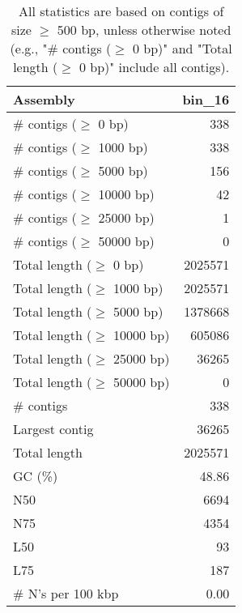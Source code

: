 \documentclass[12pt,a4paper]{article}
\begin{document}
\begin{table}[ht]
\begin{center}
\caption{All statistics are based on contigs of size $\geq$ 500 bp, unless otherwise noted (e.g., "\# contigs ($\geq$ 0 bp)" and "Total length ($\geq$ 0 bp)" include all contigs).}
\begin{tabular}{|l*{1}{|r}|}
\hline
Assembly & bin\_16 \\ \hline
\# contigs ($\geq$ 0 bp) & 338 \\ \hline
\# contigs ($\geq$ 1000 bp) & 338 \\ \hline
\# contigs ($\geq$ 5000 bp) & 156 \\ \hline
\# contigs ($\geq$ 10000 bp) & 42 \\ \hline
\# contigs ($\geq$ 25000 bp) & 1 \\ \hline
\# contigs ($\geq$ 50000 bp) & 0 \\ \hline
Total length ($\geq$ 0 bp) & 2025571 \\ \hline
Total length ($\geq$ 1000 bp) & 2025571 \\ \hline
Total length ($\geq$ 5000 bp) & 1378668 \\ \hline
Total length ($\geq$ 10000 bp) & 605086 \\ \hline
Total length ($\geq$ 25000 bp) & 36265 \\ \hline
Total length ($\geq$ 50000 bp) & 0 \\ \hline
\# contigs & 338 \\ \hline
Largest contig & 36265 \\ \hline
Total length & 2025571 \\ \hline
GC (\%) & 48.86 \\ \hline
N50 & 6694 \\ \hline
N75 & 4354 \\ \hline
L50 & 93 \\ \hline
L75 & 187 \\ \hline
\# N's per 100 kbp & 0.00 \\ \hline
\end{tabular}
\end{center}
\end{table}
\end{document}
